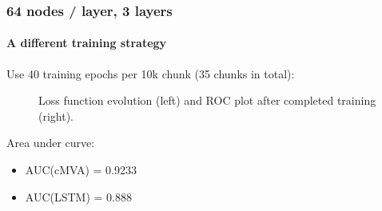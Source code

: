 \documentclass{beamer}
\begin{document}
\begin{frame}
  \frametitle{64 nodes / layer, 3 layers}
  \framesubtitle{A different training strategy}
  Use 40 training epochs per 10k chunk (35 chunks in total):

    \begin{figure}[htb]
    \centering

    \caption{Loss function evolution (left) and ROC plot after completed training (right).}
    \end{figure}

    Area under curve:
    \begin{itemize}
    \item AUC(cMVA) = 0.9233
    \item AUC(LSTM) = 0.888
    \end{itemize}
\end{frame}
\end{document}
